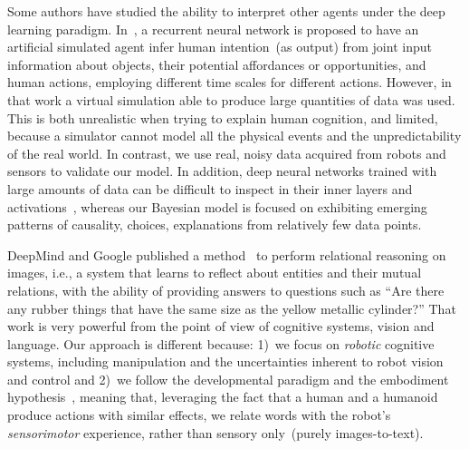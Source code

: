 Some authors have studied the ability to interpret other agents under the deep learning paradigm.
In~\cite{kim:2017:nn}, a recurrent neural network is proposed to have an artificial simulated agent infer human intention~(as output) from joint input information about objects, their potential affordances or opportunities, and human actions, employing different time scales for different actions.
However, in that work a virtual simulation able to produce large quantities of data was used.
This is both unrealistic when trying to explain human cognition, and limited, because a simulator cannot model all the physical events and the unpredictability of the real world.
In contrast, we use real, noisy data acquired from robots and sensors to validate our model.
In addition, deep neural networks trained with large amounts of data can be difficult to inspect in their inner layers and activations~\cite{szegedy:2014:intriguing}, whereas our Bayesian model is focused on exhibiting emerging patterns of causality, choices, explanations from relatively few data points.

DeepMind and Google published a method~\cite{santoro:2017:relational_reasoning} to perform relational reasoning on images, i.e., a system that learns to reflect about entities and their mutual relations, with the ability of providing answers to questions such as ``Are there any rubber things that have the same size as the yellow metallic cylinder?''
That work is very powerful from the point of view of cognitive systems, vision and language.
Our approach is different because:
1)~we focus on \emph{robotic} cognitive systems, including manipulation and the uncertainties inherent to robot vision and control and
2)~we follow the developmental paradigm and the embodiment hypothesis~\cite{lungarella:2003:devrobsurvey}, meaning that, leveraging the fact that a human and a humanoid produce actions with similar effects, we relate words with the robot's \emph{sensorimotor} experience, rather than sensory only~(purely images-to-text).


